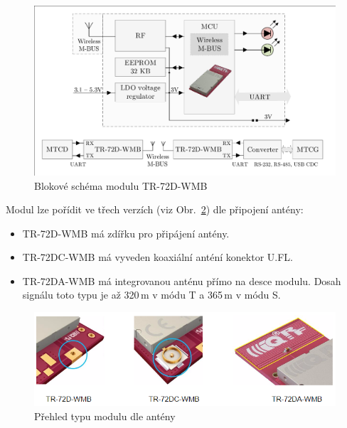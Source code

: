 \newpage

 \begin{figure}[!ht]
  \begin{center}
    \includegraphics[scale=0.6]{obrazky/modul_block}
  \end{center}
  \caption{Blokové schéma modulu TR-72D-WMB \cite{ModulIQRF}}
	\label{BlokovkaIQRF}
\end{figure}

Modul lze pořídit ve třech verzích (viz Obr.~\ref{ObrazekAnteny}) dle připojení antény:
\begin{itemize}
		\item TR-72D-WMB má zdířku pro připájení antény.
		\item TR-72DC-WMB	má vyveden koaxiální anténí konektor U.FL. 
		\item TR-72DA-WMB má integrovanou anténu přímo na desce modulu. Dosah signálu toto typu je až 320\,m v módu T a 365\,m v módu S.
\end{itemize}

 \begin{figure}[!ht]
  \begin{center}
    \includegraphics[scale=0.7]{obrazky/modul_antena}
  \end{center}
  \caption{Přehled typu modulu dle antény \cite{ModulIQRF}}
	\label{ObrazekAnteny}
\end{figure}


